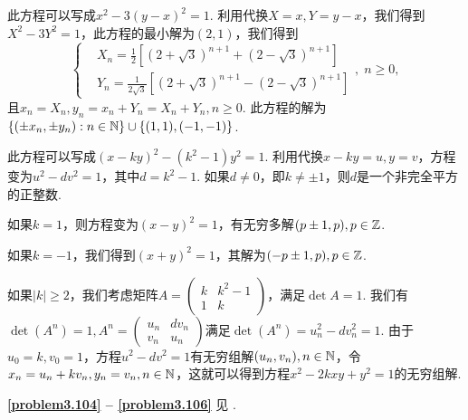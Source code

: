 \begin{solution}
  此方程可以写成$x^2-3(y-x)^2=1$. 利用代换$X=x,Y=y-x$，我们得到$X^2-3Y^2=1$，此方程的最小解为$(2,1)$，我们得到
  \[
    \left\{
    \begin{aligned}
      & X_n = \frac12\left[
        \left( 2 + \sqrt 3 \right)^{n+1} +
        \left( 2 - \sqrt 3 \right)^{n+1}
      \right] \\
      & Y_n = \frac1{2\sqrt 3}\left[
        \left( 2 + \sqrt 3 \right)^{n+1} -
        \left( 2 - \sqrt 3 \right)^{n+1}
      \right]
    \end{aligned}
    \right.,\; n\ge 0,
  \]
  且$x_n=X_n,y_n=x_n+Y_n=X_n+Y_n,n\ge0$. 此方程的解为
  $\{(\pm x_n,\pm y_n):n\in\mathbb N\}
  \cup\{(1,1),(-1,-1)\}$.
\end{solution}

\begin{solution}
  此方程可以写成$(x-ky)^2-(k^2-1)y^2=1$. 利用代换$x-ky=u,y=v$，方程变为$u^2-dv^2=1$，其中$d=k^2-1$. 如果$d\ne0$，即$k\ne\pm1$，则$d$是一个非完全平方的正整数.

  如果$k=1$，则方程变为$(x-y)^2=1$，有无穷多解$(p\pm1,p),p\in\mathbb Z$.

  如果$k=-1$，我们得到$(x+y)^2=1$，其解为$(-p\pm1,p),p\in\mathbb Z$.

  如果$|k|\ge2$，我们考虑矩阵$A=\begin{pmatrix}
    k & k^2-1 \\
    1 & k
  \end{pmatrix}$，满足$\det A=1$. 我们有$\det(A^n)=1,A^n=\begin{pmatrix}
    u_n & dv_n \\
    v_n & u_n
  \end{pmatrix}$满足$\det(A^n)=u_n^2-dv_n^2=1$. 由于$u_0=k,v_0=1$，方程$u^2-dv^2=1$有无穷组解$(u_n,v_n),n\in\mathbb N$，令$x_n=u_n+kv_n,y_n=v_n,n\in\mathbb N$，这就可以得到方程$x^2-2kxy+y^2=1$的无穷组解.
\end{solution}

\noindent\textbf{\ref{problem3.104} -- \ref{problem3.106}} 见 \cite{16}.

\setcounter{solution}{106}

